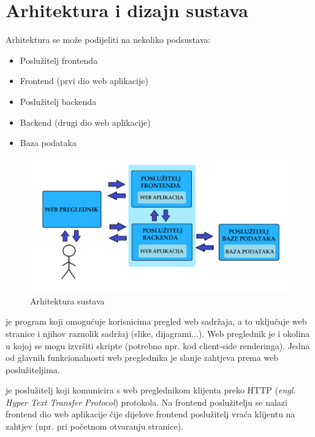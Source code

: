 \chapter{Arhitektura i dizajn sustava}
		
		Arhitektura se može podijeliti na nekoliko podsustava:
		 \begin{itemize}
			\item Poslužitelj frontenda
			\item Frontend (prvi dio web aplikacije)
			\item Poslužitelj backenda
			\item Backend (drugi dio web aplikacije)
			\item Baza podataka 
		\end{itemize}
		
		\begin{figure}[H]
			\includegraphics[width=\textwidth]{slike/arhitekturaSustava.PNG} %
			\caption{Arhitektura sustava}
			\label{fig:promjene9} %
		\end{figure}
		
		  je program koji omogućuje korisnicima pregled web sadržaja, a to uključuje web stranice i njihov raznolik sadržaj (slike, dijagrami...). Web preglednik je i okolina u kojoj se mogu izvršiti skripte (potrebno npr. kod client-side renderinga). Jedna od glavnih funkcionalnosti web preglednika je slanje zahtjeva prema web poslužiteljima.
		 	
		  je poslužitelj koji komunicira s web preglednikom klijenta preko HTTP (\textit{engl. Hyper Text Transfer Protocol}) protokola. Na frontend poslužitelju se nalazi frontend dio web aplikacije čije dijelove frontend poslužitelj vraća klijentu na zahtjev (npr. pri početnom otvaranju stranice).
		 
